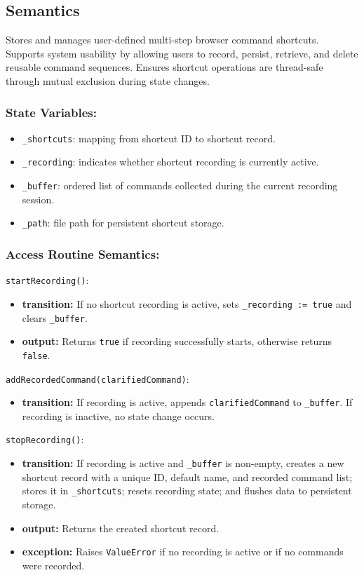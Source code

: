 \documentclass[12pt, titlepage]{article}
\begin{document}
\subsection{Semantics}

Stores and manages user-defined multi-step browser command shortcuts.
Supports system usability by allowing users to record, persist, retrieve, and delete reusable command sequences.
Ensures shortcut operations are thread-safe through mutual exclusion during state changes.

\subsubsection{State Variables:}
\begin{itemize}
\item \texttt{\_shortcuts}: mapping from shortcut ID to shortcut record.
\item \texttt{\_recording}: indicates whether shortcut recording is currently active.
\item \texttt{\_buffer}: ordered list of commands collected during the current recording session.
\item \texttt{\_path}: file path for persistent shortcut storage.
\end{itemize}

\subsubsection{Access Routine Semantics:}

\noindent\texttt{startRecording()}:
\begin{itemize}
\item \textbf{transition:} If no shortcut recording is active, sets \texttt{\_recording := true} and clears \texttt{\_buffer}.
\item \textbf{output:} Returns \texttt{true} if recording successfully starts, otherwise returns \texttt{false}.
\end{itemize}

\noindent\texttt{addRecordedCommand(clarifiedCommand)}:
\begin{itemize}
\item \textbf{transition:} If recording is active, appends \texttt{clarifiedCommand} to \texttt{\_buffer}. If recording is inactive, no state change occurs.
\end{itemize}

\noindent\texttt{stopRecording()}:
\begin{itemize}
\item \textbf{transition:} If recording is active and \texttt{\_buffer} is non-empty, creates a new shortcut record with a unique ID, default name, and recorded command list; stores it in \texttt{\_shortcuts}; resets recording state; and flushes data to persistent storage.
\item \textbf{output:} Returns the created shortcut record.
\item \textbf{exception:} Raises \texttt{ValueError} if no recording is active or if no commands were recorded.
\end{itemize}
\end{document}

